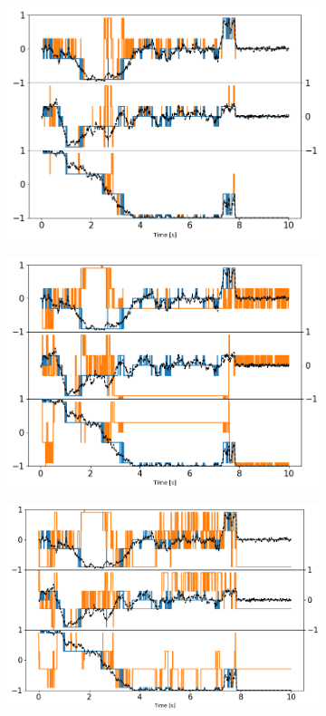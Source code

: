 \documentclass[final,  3p]{elsarticle}
\begin{document}
\begin{figure}[h]
	\centering
	\begin{subfigure}{0.33\textwidth}
			\subcaption{}
			\includegraphics[width =\textwidth]{./Images/fig8a.png}
	\end{subfigure}
	\begin{subfigure}{0.31\textwidth}
		\subcaption{}
		\includegraphics[width=\textwidth]{./Images/fig8b.png}
	\end{subfigure}
	\begin{subfigure}{0.31\textwidth}
		\subcaption{}
		\includegraphics[width=\textwidth]{./Images/fig8c.png}

\end{subfigure}
\end{figure}
\end{document}
